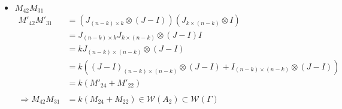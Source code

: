 \documentclass{article}
\begin{document}
\begin{itemize}
\begin{itemize}
\begin{itemize}
            \item $M_{42}M_{31}$
            \begin{align*}
                M'_{42}M'_{31}
                &= (J_{(n-k)\times k}\otimes (J-I))(J_{k\times (n-k)}\otimes I) \\
                &= J_{(n-k)\times k}J_{k\times (n-k)} \otimes (J-I)I \\
                &= kJ_{(n-k)\times (n-k)}\otimes (J-I) \\
                &= k((J-I)_{(n-k)\times (n-k)}\otimes (J-I) + I_{(n-k)\times (n-k)}\otimes (J-I) )\\
                &= k(M'_{24} + M'_{22}) \\\\
                \Rightarrow M_{42}M_{31} &= k(M_{24} + M_{22}) \in \mathcal{W}(A_2)\subset\mathcal{W}(\Gamma)
            \end{align*}
            

\end{itemize}
\end{itemize}
\end{itemize}
\end{document}
